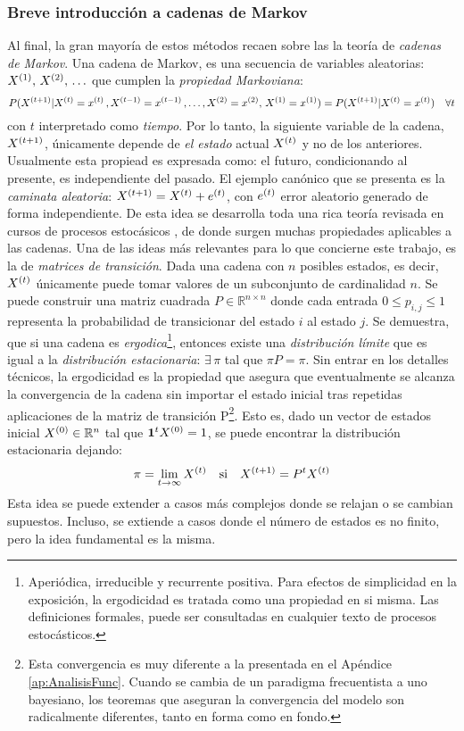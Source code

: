 \documentclass[../Main/Main.tex]{subfiles}
\begin{document}
\subsubsection{Breve introducción a cadenas de Markov}
Al final, la gran mayoría de estos métodos recaen sobre las la teoría de \textit{cadenas de Markov}. Una cadena de Markov, es una secuencia de variables aleatorias: $X^{(1)},\,X^{(2)},\,\ldots$ que cumplen la \textit{propiedad Markoviana}:
$$P(X^{(t+1)}|X^{(t)} = x^{(t)}\, ,X^{(t-1)} = x^{(t-1)}\,,\ldots,X^{(2)} = x^{(2)},\,X^{(1)} = x^{(1)}) = P(X^{(t+1)}|X^{(t)} = x^{(t)}) \quad\forall t$$
con $t$ interpretado como \textit{tiempo}. Por lo tanto, la siguiente variable de la cadena, $X^{(t+1)}$, únicamente depende de \textit{el estado} actual $X^{(t)}$ y no de los anteriores. Usualmente esta propiead es expresada como: el futuro, condicionando al presente, es independiente del pasado. El ejemplo canónico que se presenta es la \textit{caminata aleatoria}: $X^{(t+1)} = X^{(t)} + e^{(t)}$, con $e^{(t)}$ error aleatorio generado de forma independiente. De esta idea se desarrolla toda una rica teoría revisada en cursos de procesos estocásicos  \autocite{ross2009introduction}, de donde surgen muchas propiedades aplicables a las cadenas. Una de las ideas más relevantes para lo que concierne este trabajo, es la de \textit{matrices de transición}. Dada una cadena con $n$ posibles estados, es decir, $X^{(t)}$ únicamente puede tomar valores de un subconjunto de cardinalidad $n$. Se puede construir una matriz cuadrada $P\in\mathbb{R}^{n\times n}$ donde cada entrada $0\leq p_{i,j}\leq1$ representa la probabilidad de transicionar del estado $i$ al estado $j$. Se demuestra, que si una cadena es \textit{ergodica}\footnote{Aperiódica, irreducible y  recurrente positiva. Para efectos de simplicidad en la exposición, la ergodicidad es tratada como una propiedad en si misma. Las definiciones formales, puede ser consultadas en cualquier texto de procesos estocásticos.}, entonces existe una \textit{distribución límite} que es igual a la \textit{distribución estacionaria}: $\exists \,\pi$ tal que $\pi P = \pi$. Sin entrar en los detalles técnicos, la ergodicidad es la propiedad que asegura que eventualmente se alcanza la convergencia de la cadena sin importar el estado inicial tras repetidas aplicaciones de la matriz de transición P\footnote{Esta convergencia es muy diferente a la presentada en el Apéndice \ref{ap:AnalisisFunc}. Cuando se cambia de un paradigma frecuentista a uno bayesiano, los teoremas que aseguran la convergencia del modelo son radicalmente diferentes, tanto en forma como en fondo.}. Esto es, dado un vector de estados inicial $X^{(0)}\in\mathbb{R}^n$ tal que $\mathbf{1}^tX^{(0)} = 1$, se puede encontrar la distribución estacionaria dejando: 
\begin{align}
\pi = \lim_{t\rightarrow\infty} X^{(t)} \quad \text{si} \quad X^{(t+1)} = P^tX^{(t)} \label{ec:DistLimite}
\end{align}
Esta idea se puede extender a casos más complejos donde se relajan o se cambian supuestos. Incluso, se extiende a casos donde el número de estados es no finito, pero la idea fundamental es la misma. \\
\end{document}
